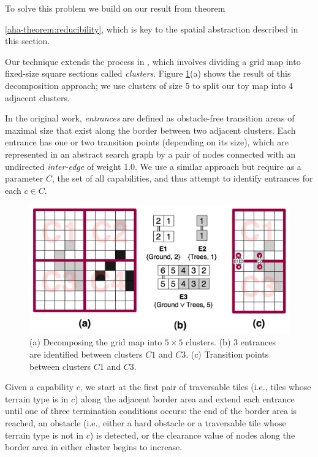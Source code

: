To solve this problem we build on our result from theorem {\ref{aha-theorem:reducibility}, which is key to the spatial abstraction described in this section.
\par \indent
Our technique extends the process in \cite{botea04}, which involves dividing a grid map into fixed-size square sections called \emph{clusters}. 
Figure \ref{aha-fig:clustersandentrances}(a) shows the result of this decomposition approach; we use clusters of size 5 to split our toy map into 4 adjacent clusters. 
\par \indent
In the original work, \emph{entrances} are defined as obstacle-free transition areas of maximal size that exist along the border between two adjacent clusters.
Each entrance has one or two transition points (depending on its size), which are represented in an abstract search graph by a pair of nodes connected with an undirected \emph{inter-edge} of weight 1.0. 
We use a similar approach but require as a parameter $C$, the set of all capabilities, and thus attempt to identify entrances for each $c \in C$. 
\begin{figure}[htbp]
	\vspace{-3pt}
        \begin{center}
                        \includegraphics[scale=0.30, trim = 20mm 20mm 20mm 0mm]{diagrams/identifying_entrances.png}
        \end{center}
        \caption{(a) Decomposing the grid map into $5 \times 5$ clusters. (b) 3 entrances are identified between clusters $C1$ and $C3$. (c) Transition points between clusters $C1$ and $C3$. \vspace{0.5em} }
        \label{aha-fig:clustersandentrances}
	\vspace{-9pt}
\end{figure}
\par \indent
Given a capability $c$,
we start at the first pair of traversable tiles (i.e., tiles whose terrain type is in $c$) along the adjacent border area and extend each entrance until one of three termination conditions occurs: the end of the border area is reached, an obstacle (i.e., either a hard obstacle or a traversable tile whose terrain type is not in $c$) is detected, or the clearance value of nodes along the border area in either cluster begins to increase. 
}

